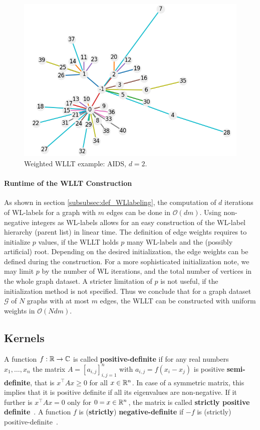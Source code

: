 		\begin{figure}[H]
			\centering
			\includegraphics[width=0.7\linewidth]{images/plot_wllt_MUTAGl2_weighted}
			\caption{Weighted WLLT example: AIDS, $d=2$.}
			\label{fig:plotwlltmutagl2weighted}
		\end{figure}
		
		\paragraph{Runtime of the WLLT Construction}	
		As shown in section \ref{subsubsec:def_WLlabeling}, the computation of $d$ iterations of WL-labels for a graph with $m$ edges can be done in $\mathcal{O}(dm)$.
		Using non-negative integers as WL-labels allows for an easy construction of the WL-label hierarchy (parent list) in linear time.
		The definition of edge weights requires to initialize $p$ values, if the WLLT holds $p$ many WL-labels and the (possibly artificial) root.
		Depending on the desired initialization, the edge weights can be defined during the construction.
		For a more sophisticated initialization note, we may limit $p$ by the number of WL iterations, and the total number of vertices in the whole graph dataset.
		A stricter limitation of $p$ is not useful, if the initialization method is not specified.		
		Thus we conclude that for a graph dataset $\mathcal{G}$ of $N$ graphs with at most $m$ edges, the WLLT can be constructed with uniform weights in $\mathcal{O}(Ndm)$.
		
\subsection{Kernels} \label{subsec:def_kernels}

	A function $f:\mathbb{R}\to\mathbb{C}$ is called \textbf{positive-definite} if for any real numbers $x_1,\dots, x_n$ the matrix 
	$A = [a_{i,j}]^n_{i,j=1}$ with $a_{i,j} = f(x_i-x_j)$ is positive \textbf{semi-definite}, that is $x^\intercal A x \ge 0$ for all $x\in\mathbb{R}^n$.
	In case of a symmetric matrix, this implies that it is positive definite if all its eigenvalues are non-negative.
	If it further is $x^\intercal A x = 0$ only for $0=x\in\mathbb{R}^n$, the matrix is called \textbf{strictly positive definite}~\cite{2008_Hofmann_CONF}. %
	A function $f$ is (\textbf{strictly}) \textbf{negative-definite} if $-f$ is (strictly) positive-definite~\cite{2007_Borgwardt_BOOK}.	
		
